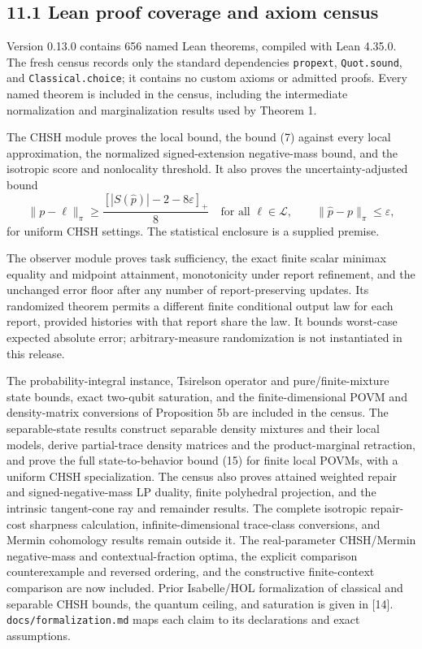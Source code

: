 \documentclass[
]{article}
\begin{document}
\subsection{11.1 Lean proof coverage and axiom census}\label{lean-proof-coverage-and-axiom-census}

Version 0.13.0 contains 656 named Lean theorems, compiled with Lean 4.35.0. The fresh census records only the standard dependencies \texttt{propext}, \texttt{Quot.sound}, and \texttt{Classical.choice}; it contains no custom axioms or admitted proofs. Every named theorem is included in the census, including the intermediate normalization and marginalization results used by Theorem 1.

The CHSH module proves the local bound, the bound (7) against every local approximation, the normalized signed-extension negative-mass bound, and the isotropic score and nonlocality threshold. It also proves the uncertainty-adjusted bound
\[
\|p-\ell\|_\pi\ge\frac{[|S(\widehat p)|-2-8\varepsilon]_+}{8}
\quad\text{for all }\ell\in\mathcal L,
\qquad \|\widehat p-p\|_\pi\le\varepsilon,
\]
for uniform CHSH settings. The statistical enclosure is a supplied premise.

The observer module proves task sufficiency, the exact finite scalar minimax equality and midpoint attainment, monotonicity under report refinement, and the unchanged error floor after any number of report-preserving updates. Its randomized theorem permits a different finite conditional output law for each report, provided histories with that report share the law. It bounds worst-case expected absolute error; arbitrary-measure randomization is not instantiated in this release.

The probability-integral instance, Tsirelson operator and pure/finite-mixture state bounds, exact two-qubit saturation, and the finite-dimensional POVM and density-matrix conversions of Proposition 5b are included in the census. The separable-state results construct separable density mixtures and their local models, derive partial-trace density matrices and the product-marginal retraction, and prove the full state-to-behavior bound (15) for finite local POVMs, with a uniform CHSH specialization. The census also proves attained weighted repair and signed-negative-mass LP duality, finite polyhedral projection, and the intrinsic tangent-cone ray and remainder results. The complete isotropic repair-cost sharpness calculation, infinite-dimensional trace-class conversions, and Mermin cohomology results remain outside it. The real-parameter CHSH/Mermin negative-mass and contextual-fraction optima, the explicit comparison counterexample and reversed ordering, and the constructive finite-context comparison are now included. Prior Isabelle/HOL formalization of classical and separable CHSH bounds, the quantum ceiling, and saturation is given in {[}14{]}. \texttt{docs/formalization.md} maps each claim to its declarations and exact assumptions.
\end{document}
